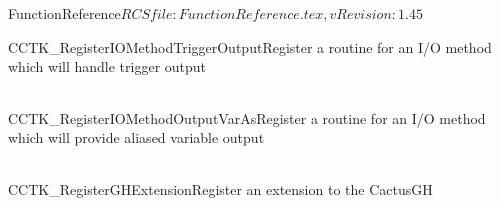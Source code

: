 \begin{cactuspart}{5}{FunctionReference}{$RCSfile: FunctionReference.tex,v $}{$Revision: 1.45 $}
\begin{CCTKFunc}{CCTK\_RegisterIOMethodTriggerOutput}{Register a routine for an I/O method which will handle trigger output}
\label{CCTK-RegisterIOMethodTriggerOutput}
\showcargs
\begin{params}
\end{params}
\begin{discussion}
\end{discussion}
\begin{examples}
\begin{tabular}{@{}p{3cm}cp{11cm}}
\end{tabular}
\end{examples}
\begin{errorcodes}
\end{errorcodes}
\end{CCTKFunc}


\begin{CCTKFunc}{CCTK\_RegisterIOMethodOutputVarAs}{Register a routine for an I/O method which will provide aliased variable output}
\label{CCTK-RegisterIOMethodOutputVarAs}
\showcargs
\begin{params}
\end{params}
\begin{discussion}
\end{discussion}
\begin{examples}
\begin{tabular}{@{}p{3cm}cp{11cm}}
\end{tabular}
\end{examples}
\begin{errorcodes}
\end{errorcodes}
\end{CCTKFunc}



\begin{CCTKFunc}{CCTK\_RegisterGHExtension}{Register an extension to the CactusGH}
\label{CCTK-RegisterGHExtension}
\showcargs
\begin{params}
\end{params}
\begin{discussion}
\end{discussion}
\begin{examples}
\begin{tabular}{@{}p{3cm}cp{11cm}}
\end{tabular}
\end{examples}
\begin{errorcodes}
\end{errorcodes}
\end{CCTKFunc}


\end{cactuspart}
